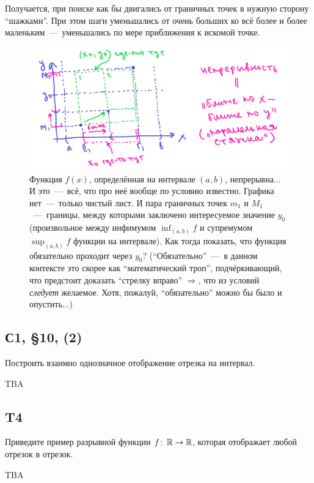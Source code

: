 \documentclass[a4paper,12pt]{article}
\begin{document}
\begin{solution}
    Получается, при поиске как бы двигались от граничных точек в нужную сторону ``шажками''.
    При этом шаги уменьшались от очень больших ко всё более и более маленьким~---~уменьшались по мере приближения к искомой точке.

    \begin{figure}[ht]
      \centering
      \includegraphics[width=0.9\linewidth]{images/somewhere-in-between.png}
    
      \caption{
        Функция $f(x)$, определённая на интервале $(a, b)$, непрерывна...
        И это~---~всё, что про неё вообще по условию известно.
        Графика нет~---~только чистый лист.
        И пара граничных точек $m_1$ и $M_1$~---~границы, между которыми заключено интересуемое значение $y_0$ (произвольное между инфимумом $\inf_{(a, b)} f$ и супремумом $\sup_{(a, b)} f$ функции на интервале).
        Как тогда показать, что функция обязательно проходит через $y_0$?
        (``Обязательно''~---~в данном контексте это скорее как ``математический троп'', подчёркивающий, что предстоит доказать ``стрелку вправо'' $\Rightarrow$, что из условий \emph{следует} желаемое.
        Хотя, пожалуй, ``обязательно'' можно бы было и опустить...)
      }
      \label{fig:somewhere-in-between}
    \end{figure}
  
  \end{solution}



  \subsection{С1, \S 10, (2)}

  Построить взаимно однозначное отображение отрезка на интервал.
  
  \begin{solution}
    TBA  %
  \end{solution}


  \subsection{T4}

  Приведите пример разрывной функции $f\colon \RR \hm\to \RR$, которая отображает любой отрезок в отрезок.
  
  \begin{solution}
    TBA  %
  \end{solution}
\end{document}
